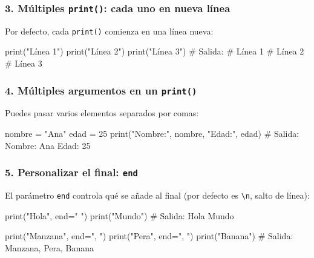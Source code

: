 \documentclass[
  doc,
  floatsintext,
  longtable,
  a4paper,
  nolmodern,
  notxfonts,
  notimes,
  12pt,
  colorlinks=true,linkcolor=blue,citecolor=blue,urlcolor=blue]{apa7}
\newenvironment{Shaded}{\begin{snugshade}}{\end{snugshade}}
\newcommand{\BuiltInTok}[1]{\textcolor[rgb]{0.00,0.23,0.31}{#1}}
\newcommand{\CommentTok}[1]{\textcolor[rgb]{0.37,0.37,0.37}{#1}}
\newcommand{\DecValTok}[1]{\textcolor[rgb]{0.68,0.00,0.00}{#1}}
\newcommand{\NormalTok}[1]{\textcolor[rgb]{0.00,0.23,0.31}{#1}}
\newcommand{\OperatorTok}[1]{\textcolor[rgb]{0.37,0.37,0.37}{#1}}
\newcommand{\StringTok}[1]{\textcolor[rgb]{0.13,0.47,0.30}{#1}}
\begin{document}
\subsubsection{\texorpdfstring{3. Múltiples \texttt{print()}: cada uno
en nueva
línea}{3. Múltiples print(): cada uno en nueva línea}}\label{muxfaltiples-print-cada-uno-en-nueva-luxednea}

Por defecto, cada \texttt{print()} comienza en una línea nueva:

\begin{Shaded}
\begin{Highlighting}[]
\BuiltInTok{print}\NormalTok{(}\StringTok{"Línea 1"}\NormalTok{)}
\BuiltInTok{print}\NormalTok{(}\StringTok{"Línea 2"}\NormalTok{)}
\BuiltInTok{print}\NormalTok{(}\StringTok{"Línea 3"}\NormalTok{)}
\CommentTok{\# Salida:}
\CommentTok{\# Línea 1}
\CommentTok{\# Línea 2}
\CommentTok{\# Línea 3}
\end{Highlighting}
\end{Shaded}

\subsubsection{\texorpdfstring{4. Múltiples argumentos en un
\texttt{print()}}{4. Múltiples argumentos en un print()}}\label{muxfaltiples-argumentos-en-un-print}

Puedes pasar varios elementos separados por comas:

\begin{Shaded}
\begin{Highlighting}[]
\NormalTok{nombre }\OperatorTok{=} \StringTok{"Ana"}
\NormalTok{edad }\OperatorTok{=} \DecValTok{25}
\BuiltInTok{print}\NormalTok{(}\StringTok{"Nombre:"}\NormalTok{, nombre, }\StringTok{"Edad:"}\NormalTok{, edad)}
\CommentTok{\# Salida: Nombre: Ana Edad: 25}
\end{Highlighting}
\end{Shaded}

\subsubsection{\texorpdfstring{5. Personalizar el final:
\texttt{end}}{5. Personalizar el final: end}}\label{personalizar-el-final-end}

El parámetro \texttt{end} controla qué se añade al final (por defecto es
\texttt{\textbackslash{}n}, salto de línea):

\begin{Shaded}
\begin{Highlighting}[]
\BuiltInTok{print}\NormalTok{(}\StringTok{"Hola"}\NormalTok{, end}\OperatorTok{=}\StringTok{" "}\NormalTok{)}
\BuiltInTok{print}\NormalTok{(}\StringTok{"Mundo"}\NormalTok{)}
\CommentTok{\# Salida: Hola Mundo}

\BuiltInTok{print}\NormalTok{(}\StringTok{"Manzana"}\NormalTok{, end}\OperatorTok{=}\StringTok{", "}\NormalTok{)}
\BuiltInTok{print}\NormalTok{(}\StringTok{"Pera"}\NormalTok{, end}\OperatorTok{=}\StringTok{", "}\NormalTok{)}
\BuiltInTok{print}\NormalTok{(}\StringTok{"Banana"}\NormalTok{)}
\CommentTok{\# Salida: Manzana, Pera, Banana}
\end{Highlighting}
\end{Shaded}
\end{document}
